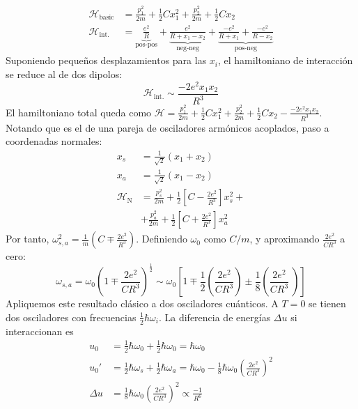 \begin{align}
  \mathcal{H}_{\text{basic}} &= \frac{p_1^2}{2m} + \frac{1}{2}C x_1^2
  +\frac{p_2^2}{2m} + \frac{1}{2}C x_2 \tag{Harmonic oscillator}\\
  \mathcal{H}_{\text{int.}} &=
                              \underbrace{\frac{e^2}{R}}_{\text{pos-pos}}
                              + \underbrace{\frac{e^2}{R+x_1-x_2}}_{\text{neg-neg}}
                              +
                              \underbrace{\frac{-e^2}{R+x_1}+\frac{-e^2}{R-x_2}}_{\text{pos-neg}}
                              \tag{Charge interaction}
\end{align}
Suponiendo pequeños desplazamientos para las $x_i$, el hamiltoniano de
interacción se reduce al de dos dipolos:
\begin{equation}
  \mathcal{H}_{\text{int.}} \sim \frac{-2e^2 x_1 x_2}{R^3}
\end{equation}
El hamiltoniano total queda como $  \mathcal{H}= \frac{p_1^2}{2m} + \frac{1}{2}C x_1^2
  +\frac{p_2^2}{2m} + \frac{1}{2}C x_2- \frac{-2e^2 x_1
    x_2}{R^3}$. Notando que es el de una pareja de osciladores
armónicos acoplados, paso a coordenadas normales:
\begin{equation}
  \begin{split}
    x_s &= \frac{1}{\sqrt 2}(x_1 +x_2) \\
    x_a &= \frac{1}{\sqrt 2}(x_1 -x_2) \\
    \mathcal{H}_{\text{N}} &= \frac{p_s^2}{2m} + \frac{1}{2} \left[ C
                             - \frac{2e^2}{R^3} \right] x_s^2 + \\
&+ \frac{p_a^2}{2m} + \frac{1}{2} \left[ C
                             + \frac{2e^2}{R^3} \right] x_a^2 
  \end{split}
\end{equation}
Por tanto, $\omega_{s,a}^2 = \frac{1}{m} \left( C \mp
    \frac{2e^2}{R^3} \right)$. Definiendo $\omega_0$ como $C/m$, y
aproximando $ \frac{2e^2}{CR^3}$ a cero:
  \begin{equation}
    \omega_{s,a} = \omega_0 \left( 1 \mp \frac{2e^2}{CR^3} \right)
    ^{\frac{1}{2}} \sim \omega_0 \left[ 1 \mp \frac{1}{2} \left(
        \frac{2e^2}{CR^3} \right) 
      \pm \frac{1}{8} \left(\frac{2e^2}{CR^3} \  \right)\right]
  \end{equation}
Apliquemos este resultado clásico a dos osciladores cuánticos. A
${T}=0$ se tienen dos osciladores con frecuencias
$\frac{1}{2}\hbar \omega_i$. La diferencia de energías $\Delta u$ si
interaccionan es
\begin{align}
  u_0 &= \frac{1}{2} \hbar \omega_0 + \frac{1}{2} \hbar \omega_0 =  \hbar
  \omega_0 \tag{No int.} \\
  u_0' &= \frac{1}{2} \hbar \omega_s + \frac{1}{2} \hbar \omega_a =  \hbar
         \omega_0 - \frac{1}{8} \hbar \omega_0 \left(
         \frac{2e^2}{CR^3} \right)^2 \tag{Interaction} \\
  \Delta u &= \frac{1}{8} \hbar \omega_0 \left( \frac{2e^2}{CR^3}
               \right)^2 \propto \frac{-1}{R^6}\tag{Interaction effect}
\end{align}

